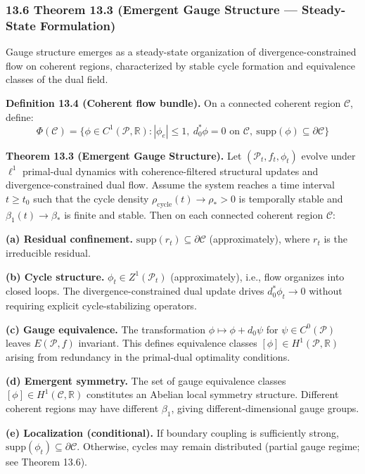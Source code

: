 \documentclass[
]{article}
\begin{document}
\subsubsection{13.6 Theorem 13.3 (Emergent Gauge Structure ---
Steady-State
Formulation)}\label{theorem-13.3-emergent-gauge-structure-steady-state-formulation}

Gauge structure emerges as a steady-state organization of
divergence-constrained flow on coherent regions, characterized by stable
cycle formation and equivalence classes of the dual field.

\textbf{Definition 13.4 (Coherent flow bundle).} On a connected coherent
region \(\mathcal{C}\), define:
\[\Phi(\mathcal{C}) = \{\phi \in C^1(\mathcal{P}, \mathbb{R}) : |\phi_e| \leq 1,\ d_0^*\phi = 0 \text{ on } \mathcal{C},\ \mathrm{supp}(\phi) \subseteq \partial\mathcal{C}\}\]

\textbf{Theorem 13.3 (Emergent Gauge Structure).} Let
\((\mathcal{P}_t, f_t, \phi_t)\) evolve under \(\ell^1\) primal-dual
dynamics with coherence-filtered structural updates and
divergence-constrained dual flow. Assume the system reaches a time
interval \(t \geq t_0\) such that the cycle density
\(\rho_{\mathrm{cycle}}(t) \to \rho_* > 0\) is temporally stable and
\(\beta_1(t) \to \beta_*\) is finite and stable. Then on each connected
coherent region \(\mathcal{C}\):

\textbf{(a) Residual confinement.}
\(\mathrm{supp}(r_t) \subseteq \partial\mathcal{C}\) (approximately),
where \(r_t\) is the irreducible residual.

\textbf{(b) Cycle structure.} \(\phi_t \in Z^1(\mathcal{P}_t)\)
(approximately), i.e., flow organizes into closed loops. The
divergence-constrained dual update drives \(d_0^*\phi_t \to 0\) without
requiring explicit cycle-stabilizing operators.

\textbf{(c) Gauge equivalence.} The transformation
\(\phi \mapsto \phi + d_0\psi\) for \(\psi \in C^0(\mathcal{P})\) leaves
\(E(\mathcal{P}, f)\) invariant. This defines equivalence classes
\([\phi] \in H^1(\mathcal{P}, \mathbb{R})\) arising from redundancy in
the primal-dual optimality conditions.

\textbf{(d) Emergent symmetry.} The set of gauge equivalence classes
\([\phi] \in H^1(\mathcal{C}, \mathbb{R})\) constitutes an Abelian local
symmetry structure. Different coherent regions may have different
\(\beta_1\), giving different-dimensional gauge groups.

\textbf{(e) Localization (conditional).} If boundary coupling is
sufficiently strong,
\(\mathrm{supp}(\phi_t) \subseteq \partial\mathcal{C}\). Otherwise,
cycles may remain distributed (partial gauge regime; see Theorem 13.6).
\end{document}
